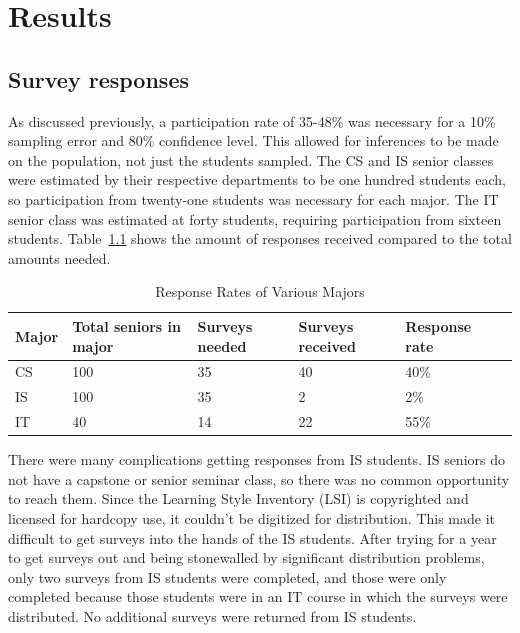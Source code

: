 \chapter{Results}\label{chp:chapter4}
\section{Survey responses}
As discussed previously, a participation rate of 35-48\% was necessary for a 10\% sampling error and 80\% confidence level. This allowed for inferences to be made on the population, not just the students sampled. The CS and IS senior classes were estimated by their respective departments to be one hundred students each, so participation from twenty-one students was necessary for each major. The IT senior class was estimated at forty students, requiring participation from sixteen students. Table~\ref{tab:response-rates} shows the amount of responses received compared to the total amounts needed.

\begin{table}[h!]
  \centering
  \caption{Response Rates of Various Majors}
  \label{tab:response-rates}
  \begin{tabular}{llllll}
    \toprule
    Major & Total seniors in major & Surveys needed & Surveys received & Response rate\\
    \midrule
    CS    & 100                    & 35             & 40               & 40\%\\
    IS    & 100                    & 35             & 2                & 2\%\\
    IT    & 40                     & 14             & 22               & 55\%\\
    \bottomrule
  \end{tabular}
\end{table}

There were many complications getting responses from IS students. IS seniors do not have a capstone or senior seminar class, so there was no common opportunity to reach them. Since the Learning Style Inventory (LSI) is copyrighted and licensed for hardcopy use, it couldn't be digitized for distribution. This made it difficult to get surveys into the hands of the IS students. After trying for a year to get surveys out and being stonewalled by significant distribution problems, only two surveys from IS students were completed, and those were only completed because those students were in an IT course in which the surveys were distributed. No additional surveys were returned from IS students.


